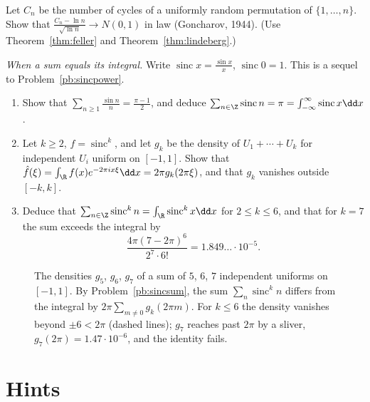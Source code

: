 \begin{exercise}[$\star\star\star$]\label{ex:cyclesclt}
Let $C_n$ be the number of cycles of a uniformly random permutation of $\{1,\dots,n\}$. Show that $\frac{C_n-\ln n}{\sqrt{\ln n}}\to N(0,1)$ in law
(Goncharov, 1944). (Use Theorem~\ref{thm:feller} and Theorem~\ref{thm:lindeberg}.)
\end{exercise}

\begin{exercise}[$\star\star\star$]\label{pb:sincsum}
\emph{When a sum equals its integral.} Write $\operatorname{sinc}x=\frac{\sin x}x$, $\operatorname{sinc}0=1$. This is a sequel to
Problem~\ref{pb:sincpower}.
\begin{enumerate}[label=(\alph*)]
\item Show that $\sum_{n\ge1}\frac{\sin n}n=\frac{\pi-1}2$, and deduce $\sum_{n\in\Z}\operatorname{sinc}n=\pi=\int_{-\infty}^\infty\operatorname{sinc}x\dd x$.
\item Let $k\ge2$, $f=\operatorname{sinc}^k$, and let $g_k$ be the density of $U_1+\cdots+U_k$ for independent $U_i$ uniform on $[-1,1]$. Show
that $\hat f(\xi)=\int_{\R}f(x)e^{-2\pi ix\xi}\dd x=2\pi g_k(2\pi\xi)$, and that $g_k$ vanishes outside $[-k,k]$.
\item Deduce that $\sum_{n\in\Z}\operatorname{sinc}^kn=\int_{\R}\operatorname{sinc}^kx\dd x$ for $2\le k\le6$, and that for $k=7$ the sum exceeds the
integral by
\[
\frac{4\pi(7-2\pi)^6}{2^7\cdot6!}=1.849\ldots\cdot10^{-5}.
\]
\end{enumerate}
\end{exercise}

\begin{figure}[ht]
\centering
{}
\caption{The densities $g_5$, $g_6$, $g_7$ of a sum of $5$, $6$, $7$ independent uniforms on $[-1,1]$. By Problem~\ref{pb:sincsum}, the sum
$\sum_n\operatorname{sinc}^kn$ differs from the integral by $2\pi\sum_{m\ne0}g_k(2\pi m)$. For $k\le6$ the density vanishes beyond $\pm6<2\pi$
(dashed lines); $g_7$ reaches past $2\pi$ by a sliver, $g_7(2\pi)=1.47\cdot10^{-6}$, and the identity fails.}
\label{fig:sinc}
\end{figure}

\section{Hints}

